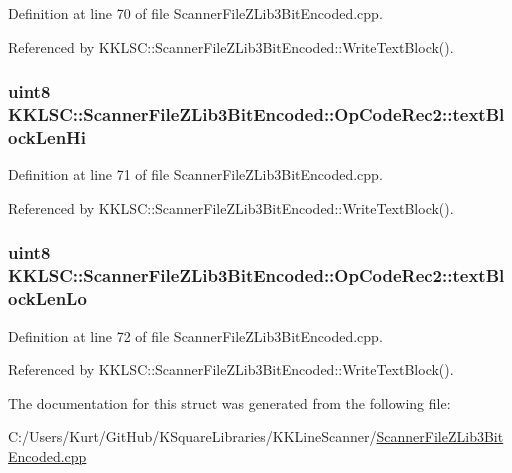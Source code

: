 Definition at line 70 of file Scanner\+File\+Z\+Lib3\+Bit\+Encoded.\+cpp.



Referenced by K\+K\+L\+S\+C\+::\+Scanner\+File\+Z\+Lib3\+Bit\+Encoded\+::\+Write\+Text\+Block().

\subsubsection[{\texorpdfstring{text\+Block\+Len\+Hi}{textBlockLenHi}}]{\setlength{\rightskip}{0pt plus 5cm}uint8 K\+K\+L\+S\+C\+::\+Scanner\+File\+Z\+Lib3\+Bit\+Encoded\+::\+Op\+Code\+Rec2\+::text\+Block\+Len\+Hi}\hypertarget{struct_scanner_file_z_lib3_bit_encoded_1_1_op_code_rec2_acfe4fd4ee3dd3549e1af9bf5237c66f4}{}\label{struct_scanner_file_z_lib3_bit_encoded_1_1_op_code_rec2_acfe4fd4ee3dd3549e1af9bf5237c66f4}


Definition at line 71 of file Scanner\+File\+Z\+Lib3\+Bit\+Encoded.\+cpp.



Referenced by K\+K\+L\+S\+C\+::\+Scanner\+File\+Z\+Lib3\+Bit\+Encoded\+::\+Write\+Text\+Block().

\subsubsection[{\texorpdfstring{text\+Block\+Len\+Lo}{textBlockLenLo}}]{\setlength{\rightskip}{0pt plus 5cm}uint8 K\+K\+L\+S\+C\+::\+Scanner\+File\+Z\+Lib3\+Bit\+Encoded\+::\+Op\+Code\+Rec2\+::text\+Block\+Len\+Lo}\hypertarget{struct_scanner_file_z_lib3_bit_encoded_1_1_op_code_rec2_abf0f3cea1d177ff8178b0475e79b23d3}{}\label{struct_scanner_file_z_lib3_bit_encoded_1_1_op_code_rec2_abf0f3cea1d177ff8178b0475e79b23d3}


Definition at line 72 of file Scanner\+File\+Z\+Lib3\+Bit\+Encoded.\+cpp.



Referenced by K\+K\+L\+S\+C\+::\+Scanner\+File\+Z\+Lib3\+Bit\+Encoded\+::\+Write\+Text\+Block().



The documentation for this struct was generated from the following file\+:\begin{DoxyCompactItemize}
\item 
C\+:/\+Users/\+Kurt/\+Git\+Hub/\+K\+Square\+Libraries/\+K\+K\+Line\+Scanner/\hyperlink{_scanner_file_z_lib3_bit_encoded_8cpp}{Scanner\+File\+Z\+Lib3\+Bit\+Encoded.\+cpp}\end{DoxyCompactItemize}
